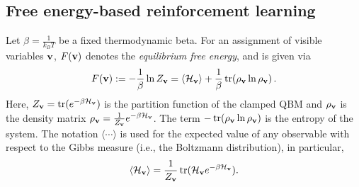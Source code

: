 \documentclass[pra,twocolumn,floatfix,superscriptaddress]{revtex4}
\DeclareMathOperator{\tr}{tr}
\begin{document}
\subsection{Free energy-based reinforcement learning}
\label{RL}


Let $\beta= \frac{1}{k_B T}$ be a fixed thermodynamic beta. For an assignment of visible variables $\bold v$, $F(\bold{v})$ denotes the \emph{equilibrium free energy}, and is given via 
\begin{align}\label{eq:free-def}
F(\bold{v}) := - \frac{1}\beta \ln Z_{\bold v} = \langle \mathcal H_{\bold v} \rangle + \frac{1}\beta \tr (\rho_{\bold v} \ln \rho_{\bold v})\,.
\end{align}
Here, $Z_{\bold v} = \tr (e^{-\beta \mathcal H_{\bold v}})$ is the partition function of the clamped QBM and $\rho_{\bold v}$ is the density matrix $\rho_{\bold v} = \frac{1}{Z_{\bold v}}e^{-\beta \mathcal H_{\bold v}}$. The term $- \tr (\rho_{\bold v} \ln \rho_{\bold v})$ is the entropy of the system. 
The notation $\langle \cdots \rangle$ is used for the expected value of any observable with respect to the Gibbs measure (i.e., the Boltzmann distribution), in particular,
$$\langle \mathcal H_{\bold v} \rangle = \frac{1}{Z_{\mathbf v}} \tr( \mathcal H_{\bold v} e^{-\beta \mathcal H_{\bold v}}).$$ 
\end{document}
